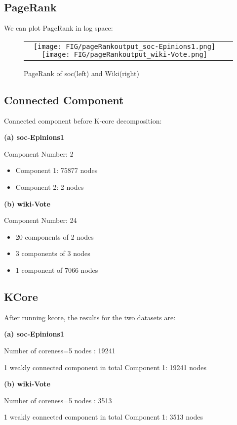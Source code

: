 \subsection{PageRank}

We can plot PageRank in log space:

\begin{figure}[H]
\begin{center}
\begin{tabular}{cc}
     \texttt{[image: FIG/pageRankoutput\_soc-Epinions1.png]} 
     \texttt{[image: FIG/pageRankoutput\_wiki-Vote.png]} 
\end{tabular}
\caption{PageRank of soc(left) and Wiki(right)}
\label{fig:results}
\end{center}
\end{figure}

\subsection{Connected Component}

\par Connected component before K-core decomposition: \\
\par \textbf{(a) soc-Epinions1}
\par Component Number: 2
\begin{itemize}
\item Component 1: 75877 nodes
\item Component 2: 2 nodes
\end{itemize}

\par \textbf{(b) wiki-Vote}
\par Component Number: 24
\begin{itemize}
\item 20 components of 2 nodes
\item 3 components of 3 nodes
\item 1 component of 7066 nodes
\end{itemize}

\subsection{KCore}

\par After running kcore, the results for the two datasets are: \\
\par \textbf{(a) soc-Epinions1}
\par Number of coreness=5 nodes : 19241
\par 1 weakly connected component in total Component 1: 19241 nodes\\

\par \textbf{(b) wiki-Vote}
\par Number of coreness=5 nodes : 3513
\par 1 weakly connected component in total Component 1: 3513 nodes